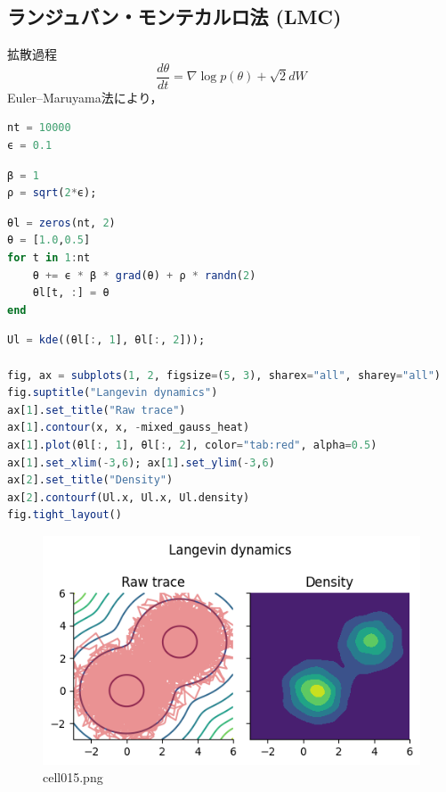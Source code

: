 \subsection{ランジュバン・モンテカルロ法 (LMC)}
拡散過程
\begin{equation}
{\frac{d\theta}{dt}}=\nabla \log p (\theta)+{\sqrt 2}{d{W}}
\end{equation}
Euler–Maruyama法により，
\begin{lstlisting}[language=julia]
nt = 10000
ϵ = 0.1
\end{lstlisting}
\begin{lstlisting}[language=julia]
β = 1
ρ = sqrt(2*ϵ);
\end{lstlisting}
\begin{lstlisting}[language=julia]
θl = zeros(nt, 2)
θ = [1.0,0.5]
for t in 1:nt
    θ += ϵ * β * grad(θ) + ρ * randn(2)
    θl[t, :] = θ
end
\end{lstlisting}
\begin{lstlisting}[language=julia]
Ul = kde((θl[:, 1], θl[:, 2]));

fig, ax = subplots(1, 2, figsize=(5, 3), sharex="all", sharey="all")
fig.suptitle("Langevin dynamics")
ax[1].set_title("Raw trace")
ax[1].contour(x, x, -mixed_gauss_heat)
ax[1].plot(θl[:, 1], θl[:, 2], color="tab:red", alpha=0.5)
ax[1].set_xlim(-3,6); ax[1].set_ylim(-3,6)
ax[2].set_title("Density")
ax[2].contourf(Ul.x, Ul.x, Ul.density)
fig.tight_layout()
\end{lstlisting}
\begin{figure}[ht]
	\centering
	\includegraphics[scale=0.8, max width=\linewidth]{./fig/bayesian-brain/mcmc/cell015.png}
	\caption{cell015.png}
	\label{cell015.png}
\end{figure}
